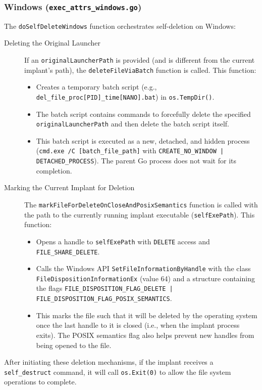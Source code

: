 \subsubsection{Windows (\texttt{exec\_attrs\_windows.go})}
The \texttt{doSelfDeleteWindows} function orchestrates self-deletion on Windows:
\begin{description}
    \item[Deleting the Original Launcher] If an \texttt{originalLauncherPath} is provided (and is different from the current implant's path), the \texttt{deleteFileViaBatch} function is called. This function:
        \begin{itemize}
            \item Creates a temporary batch script (e.g., \texttt{del\_file\_proc[PID]\_time[NANO].bat}) in \texttt{os.TempDir()}.
            \item The batch script contains commands to forcefully delete the specified \texttt{originalLauncherPath} and then delete the batch script itself.
            \item This batch script is executed as a new, detached, and hidden process (\texttt{cmd.exe /C [batch\_file\_path]} with \texttt{CREATE\_NO\_WINDOW | DETACHED\_PROCESS}). The parent Go process does not wait for its completion.
        \end{itemize}
    \item[Marking the Current Implant for Deletion] The \texttt{markFileForDeleteOnCloseAndPosixSemantics} function is called with the path to the currently running implant executable (\texttt{selfExePath}). This function:
        \begin{itemize}
            \item Opens a handle to \texttt{selfExePath} with \texttt{DELETE} access and \texttt{FILE\_SHARE\_DELETE}.
            \item Calls the Windows API \texttt{SetFileInformationByHandle} with the class \texttt{FileDispositionInformationEx} (value 64) and a structure containing the flags \texttt{FILE\_DISPOSITION\_FLAG\_DELETE | FILE\_DISPOSITION\_FLAG\_POSIX\_SEMANTICS}.
            \item This marks the file such that it will be deleted by the operating system once the last handle to it is closed (i.e., when the implant process exits). The POSIX semantics flag also helps prevent new handles from being opened to the file.
        \end{itemize}
\end{description}
After initiating these deletion mechanisms, if the implant receives a \texttt{self\_destruct} command, it will call \texttt{os.Exit(0)} to allow the file system operations to complete.

